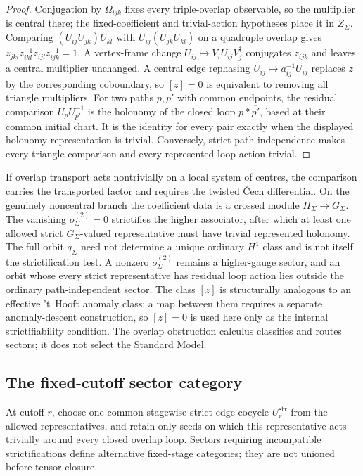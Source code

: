 \documentclass[11pt]{article}
\begin{document}
\begin{proof}
Conjugation by \(\Omega_{ijk}\) fixes every triple-overlap observable, so the
multiplier is central there; the fixed-coefficient and trivial-action
hypotheses place it in \(Z_\Sigma\). Comparing \((U_{ij}U_{jk})U_{kl}\) with
\(U_{ij}(U_{jk}U_{kl})\) on a quadruple overlap gives
\(z_{jkl}z_{ikl}^{-1}z_{ijl}z_{ijk}^{-1}=1\). A vertex-frame change
\(U_{ij}\mapsto V_iU_{ij}V_j^\dagger\) conjugates \(z_{ijk}\) and leaves a
central multiplier unchanged. A central edge rephasing
\(U_{ij}\mapsto a_{ij}^{-1}U_{ij}\) replaces \(z\) by the corresponding
coboundary, so \([z]=0\) is equivalent to removing all triangle multipliers.
For two paths \(p,p'\) with common endpoints, the residual comparison
\(U_pU_{p'}^{-1}\) is the holonomy of the closed loop
\(p\ast\overline{p'}\), based at their common initial chart. It is the
identity for every pair exactly when the displayed holonomy representation
is trivial. Conversely, strict
path independence makes every triangle comparison and every represented loop
action trivial.
\end{proof}

If overlap transport acts nontrivially on a local system of centres, the
comparison carries the transported factor and requires the twisted \v{C}ech
differential. On the genuinely noncentral branch the coefficient data is a
crossed module \(H_\Sigma\to G_\Sigma\). The vanishing \(o^{(2)}_\Sigma=0\)
strictifies the higher associator, after which at least one allowed strict
\(G_\Sigma\)-valued representative must have trivial represented holonomy. The
full orbit \(q_\Sigma\) need not determine a unique ordinary \(H^1\) class
and is not itself the strictification test. A nonzero \(o^{(2)}_\Sigma\)
remains a higher-gauge sector, and an orbit whose every strict representative
has residual loop action lies outside the ordinary path-independent sector.
The class \([z]\) is structurally analogous to an effective 't~Hooft anomaly
class; a map between them requires a separate anomaly-descent construction,
so \([z]=0\) is used here only as the internal strictifiability condition.
The overlap obstruction calculus classifies and routes sectors; it does not
select the Standard Model.

\subsection{The fixed-cutoff sector category}

At cutoff \(r\), choose one common stagewise strict edge cocycle
\(U^{\mathrm{str}}_r\) from the allowed representatives, and retain only seeds
on which this representative acts trivially around every closed overlap loop.
Sectors requiring incompatible strictifications define alternative
fixed-stage categories; they are not unioned before tensor closure.
\end{document}
